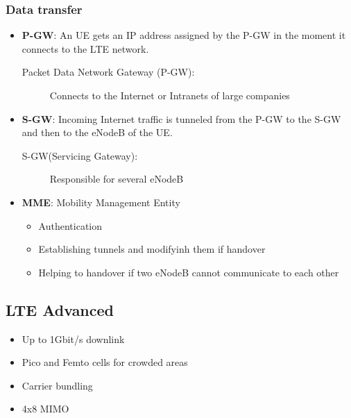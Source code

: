 \subsubsection{Data transfer}
\begin{itemize}
    \item \textbf{P-GW}: An UE gets an IP address assigned by the P-GW
        in the moment it connects to the LTE network.
        \begin{description}
            \item[Packet Data Network Gateway (P-GW):] Connects to the Internet
                or Intranets of large companies
        \end{description}

    \item \textbf{S-GW}: Incoming Internet traffic is tunneled from the P-GW
        to the S-GW and then to the eNodeB of the UE.

        \begin{description}
            \item[S-GW(Servicing Gateway):] Responsible for several eNodeB
        \end{description}

    \item \textbf{MME}: Mobility Management Entity
        \begin{itemize}
            \item Authentication
            \item Establishing tunnels and modifyinh them if handover
            \item Helping to handover if two eNodeB cannot communicate to each other
        \end{itemize}
\end{itemize}

\subsection{LTE Advanced}
\begin{itemize}
	\item Up to 1Gbit/s downlink
	\item Pico and Femto cells for crowded areas
	\item Carrier bundling
	\item 4x8 MIMO

\end{itemize}
